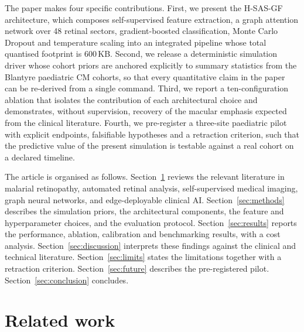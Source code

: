 \documentclass[twocolumn,10pt]{article}
\begin{document}
The paper makes four specific contributions. First, we present the
H-SAS-GF architecture, which composes self-supervised feature
extraction, a graph attention network over 48 retinal sectors,
gradient-boosted classification, Monte Carlo Dropout and
temperature scaling into an integrated pipeline whose total
quantised footprint is $600$\,KB. Second, we release a
deterministic simulation driver whose cohort priors are anchored
explicitly to summary statistics from the Blantyre paediatric CM
cohorts, so that every quantitative claim in the paper can be
re-derived from a single command. Third, we report a
ten-configuration ablation that isolates the contribution of each
architectural choice and demonstrates, without supervision,
recovery of the macular emphasis expected from the clinical
literature. Fourth, we pre-register a three-site paediatric pilot
with explicit endpoints, falsifiable hypotheses and a retraction
criterion, such that the predictive value of the present
simulation is testable against a real cohort on a declared
timeline.

The article is organised as follows.
Section~\ref{sec:related_work} reviews the relevant literature in
malarial retinopathy, automated retinal analysis, self-supervised
medical imaging, graph neural networks, and edge-deployable
clinical AI. Section~\ref{sec:methods} describes the simulation
priors, the architectural components, the feature and
hyperparameter choices, and the evaluation protocol.
Section~\ref{sec:results} reports the performance, ablation,
calibration and benchmarking results, with a cost analysis.
Section~\ref{sec:discussion} interprets these findings against
the clinical and technical literature.
Section~\ref{sec:limits} states the limitations together with a
retraction criterion. Section~\ref{sec:future} describes the
pre-registered pilot. Section~\ref{sec:conclusion} concludes.

\section{Related work}
\label{sec:related_work}
\end{document}
